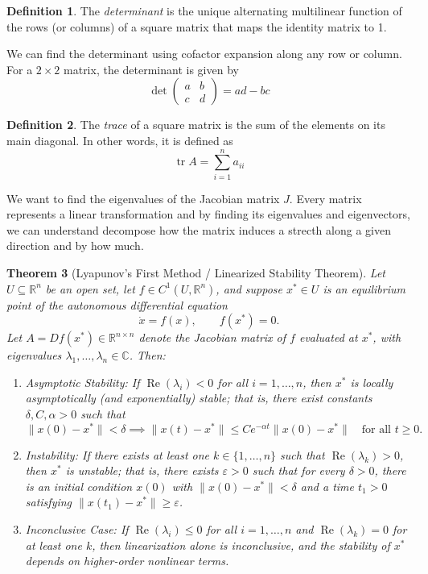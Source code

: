\documentclass{article}
\newtheorem{theorem}{Theorem}[section]
\theoremstyle{definition}
\newtheorem{definition}[theorem]{Definition}
\begin{document}
\begin{definition}
    The \emph{determinant} is the unique alternating multilinear function of the rows (or columns) of a square matrix that maps the identity matrix to 1.
\end{definition}
We can find the determinant using cofactor expansion along any row or column. For a $2 \times 2$ matrix, the determinant is given by
\begin{equation*}
    \det \begin{pmatrix}
        a & b \\
        c & d
    \end{pmatrix} = ad - bc
\end{equation*}
\begin{definition}
    The \emph{trace} of a square matrix is the sum of the elements on its main diagonal. In other words, it is defined as 
    \begin{equation*}
        \operatorname{tr} A = \sum_{i=1}^{n} a_{ii}
    \end{equation*}
\end{definition}
We want to find the eigenvalues of the Jacobian matrix $J$. Every matrix represents a linear transformation and by finding its eigenvalues and eigenvectors, we can understand decompose how the matrix induces a strecth along a given direction and by how much. 
\begin{theorem}[Lyapunov's First Method / Linearized Stability Theorem]
Let $U \subseteq \mathbb{R}^n$ be an open set, let $f \in C^1(U, \mathbb{R}^n)$, and suppose $x^* \in U$ is an equilibrium point of the autonomous differential equation
\begin{equation*}
    \dot{x} = f(x), \qquad f(x^*) = 0.
\end{equation*}
Let $A = Df(x^*) \in \mathbb{R}^{n \times n}$ denote the Jacobian matrix of $f$ evaluated at $x^*$, with eigenvalues $\lambda_1, \dots, \lambda_n \in \mathbb{C}$. Then:
\begin{enumerate}
    \item Asymptotic Stability: If $\operatorname{Re}(\lambda_i) < 0$ for all $i = 1, \dots, n$, then $x^*$ is locally asymptotically (and exponentially) stable; that is, there exist constants $\delta, C, \alpha > 0$ such that
    \begin{equation*}
        \|x(0) - x^*\| < \delta \implies \|x(t) - x^*\| \le C e^{-\alpha t}\|x(0) - x^*\| \quad \text{for all } t \ge 0.
    \end{equation*}
    \item Instability: If there exists at least one $k \in \{1, \dots, n\}$ such that $\operatorname{Re}(\lambda_k) > 0$, then $x^*$ is unstable; that is, there exists $\varepsilon > 0$ such that for every $\delta > 0$, there is an initial condition $x(0)$ with $\|x(0) - x^*\| < \delta$ and a time $t_1 > 0$ satisfying $\|x(t_1) - x^*\| \ge \varepsilon$.
    \item Inconclusive Case: If $\operatorname{Re}(\lambda_i) \le 0$ for all $i = 1, \dots, n$ and $\operatorname{Re}(\lambda_k) = 0$ for at least one $k$, then linearization alone is inconclusive, and the stability of $x^*$ depends on higher-order nonlinear terms.
\end{enumerate}
\end{theorem}
\end{document}

